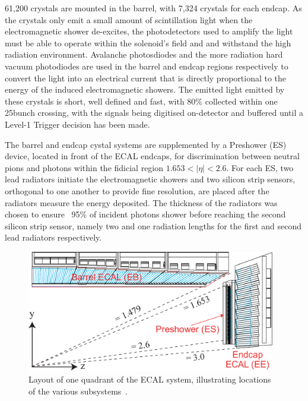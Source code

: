 61,200 crystals are mounted in the barrel, with 7,324 crystals for each endcap.
As the crystals only emit a small amount of scintillation light when the electromagnetic shower de-excites, the photodetectors used to amplify the light must be able to operate within the solenoid's field and and withstand the high radiation environment.
Avalanche photosdiodes and the more radiation hard vacuum photodiodes are used in the barrel and endcap regions respectively to convert the light into an electrical current that is directly proportional to the energy of the induced electromagnetic showers.
The emitted light emitted by these crystals is short, well defined and fast, with 80\% collected within one 25\ns bunch crossing, with the signals being digitised on-detector and buffered until a Level-1 Trigger decision has been made.

The barrel and endcap cystal systems are supplemented by a Preshower (ES)~\cite{Loos:539819} device, located in front of the ECAL endcaps, for discrimination between neutral pions and photons within the fidicial region $1.653 < |\eta| < 2.6$.
For each ES, two lead radiators initiate the electromagnetic showers and two silicon strip sensors, orthogonal to one another to provide fine resolution, are placed after the radiators measure the energy deposited.
The thickness of the radiators was chosen to ensure ~95\% of incident photons shower before reaching the second silicon strip sensor, namely two and one radiation lengths for the first and second lead radiators respectively.

\begin{figure}[htbp]
\begin{center}
\includegraphics[width=0.97\textwidth]{figs/cms/ECAL_Transverse_section.pdf}
\caption{Layout of one quadrant of the ECAL system, illustrating locations of the various subsystems~\cite{Bayatian:2006nff}.}
\label{fig:ecal}
\end{center}
\end{figure}

